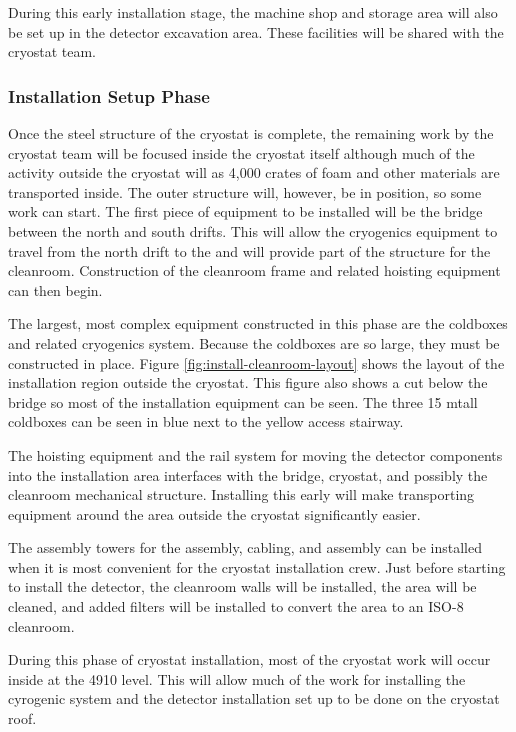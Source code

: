 During this early installation stage, the machine shop and  storage area will also be set up in the detector excavation area. These facilities will be shared with the cryostat team. 

\subsubsection{Installation Setup Phase}

Once the steel structure of the cryostat is complete, the remaining work by the cryostat team will be focused inside the cryostat itself although 
much of the activity outside the cryostat will as 4,000 crates of foam and other materials are transported inside. The outer structure will, however, be in position, so some  work can start. 
The first piece of equipment to be installed will be the bridge between the north and south drifts. 
This will allow the cryogenics equipment to travel from the north drift to the  and will provide part of the structure for the cleanroom. 
Construction of the cleanroom frame and related hoisting equipment can then begin. 

The largest, most complex equipment constructed in this phase are the coldboxes and related cryogenics system. 
Because the coldboxes are so large, they must be constructed in place. 
Figure \ref{fig:install-cleanroom-layout} shows the layout of the installation region outside the cryostat. 
This figure also shows a cut below the bridge so most of the installation equipment can be seen. 
The three 15 \si{m}tall coldboxes can be seen in blue next to the yellow access stairway. 

The hoisting equipment and the rail system for moving the detector components into the installation area interfaces with the bridge, cryostat, and possibly the cleanroom mechanical structure. 
Installing this early will make transporting equipment around the area outside the cryostat significantly easier. 
 
The assembly towers for the  assembly,  cabling, and  assembly can be installed when it is most convenient for the cryostat installation crew. 
Just before starting to install the detector, the cleanroom walls will be installed, the area will be cleaned, and added filters will be installed to convert the area to an ISO-8 cleanroom.

During this phase of cryostat installation, most of the cryostat work will occur inside at the 4910 level. 
This will allow much of the work for installing the cyrogenic system and the detector installation set up to be done on the cryostat roof. 


